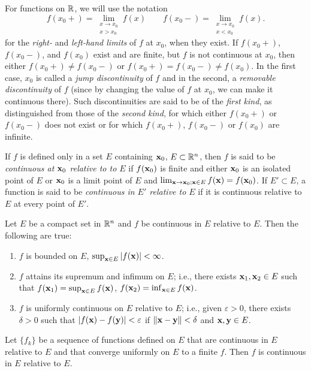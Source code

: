 For functions on $\mathbb{R}$, we will use the notation
\begin{equation}
  \label{eq:continuous-function}
f(x_0+)=\lim_{\substack{x\to x_0\\x>x_0}}f(x)\qquad
f(x_0-)=\lim_{\substack{x\to x_0\\x<x_0}}f(x).
\end{equation}
for the \emph{right-} and \emph{left-hand limits} of $f$ at $x_0$, when
they exist. If $f(x_0+)$, $f(x_0-)$, and $f(x_0)$ exist and are finite, but
$f$ is not continuous at $x_0$, then either $f(x_0+)\neq f(x_0-)$ or
$f(x_0+)=f(x_0-)\neq f(x_0)$. In the first case, $x_0$ is called a
\emph{jump discontinuity} of $f$ and in the second, a \emph{removable
  discontinuity} of $f$ (since by changing the value of $f$ at $x_0$, we
can make it continuous there). Such discontinuities are said to be of the
\emph{first kind}, as distinguished from those of the \emph{second kind},
for which either $f(x_0+)$ or $f(x_0-)$ does not exist or for which
$f(x_0+)$, $f(x_0-)$ or $f(x_0)$ are infinite.

If $f$ is defined only in a set $E$ containing $\mathbf{x}_0$, $E\subset\mathbb{R}^n$,
then $f$ is said to be \emph{continuous at $\mathbf{x}_0$ relative to  to $E$} if
$f(\mathbf{x}_0)$ is finite and either $\mathbf{x}_0$ is an isolated point of $E$ or
$\mathbf{x}_0$ is a limit point of $E$ and $\lim_{\mathbf{x}\to\mathbf{x}_0;\mathbf{x}\in
  E}f(\mathbf{x})=f(\mathbf{x}_0)$. If $E'\subset E$, a function is said to be
\emph{continuous in $E'$ relative to $E$} if it is continuous relative to
$E$ at every point of $E'$.

\begin{theorem}[1.15]
Let $E$ be a compact set in $\mathbb{R}^n$ and $f$ be continuous in $E$ relative
to $E$. Then the following are true:
\begin{enumerate}[label=\textnormal{(\roman*)}]
\item $f$ is bounded on $E$, $\sup_{\mathbf{x}\in E}|f(\mathbf{x})|<\infty$.
\item $f$ attains its supremum and infimum on $E$; i.e., there exists
  $\mathbf{x}_1,\mathbf{x}_2\in E$ such that $f(\mathbf{x}_1)=\sup_{\mathbf{x}\in E}f(\mathbf{x})$,
  $f(\mathbf{x}_2)=\inf_{\mathbf{x}\in E}f(\mathbf{x})$.
\item $f$ is uniformly continuous on $E$ relative to $E$; i.e., given
  $\varepsilon>0$, there exists $\delta>0$ such that
  $|f(\mathbf{x})-f(\mathbf{y})|<\varepsilon$ if $\|\mathbf{x}-\mathbf{y}\|<\delta$ and
  $\mathbf{x},\mathbf{y}\in E$.
\end{enumerate}
\end{theorem}

\begin{theorem}[1.16]
Let $\{f_k\}$ be a sequence of functions defined on $E$ that are continuous
in $E$ relative to $E$ and that converge uniformly on $E$ to a finite
$f$. Then $f$ is continuous in $E$ relative to $E$.
\end{theorem}

